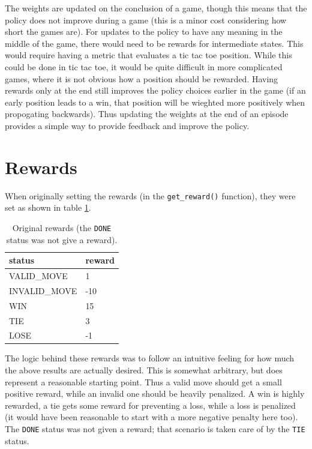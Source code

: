 \documentclass{article}
\renewcommand{\arraystretch}{1.25}
\begin{document}
   The weights are updated on the conclusion of a game, though this means that the policy does not improve
   during a game (this is a minor cost considering how short the games are). For updates to the policy to have
   any meaning in the middle of the game, there would need to be rewards for intermediate states. This would
   require having a metric that evaluates a tic tac toe position. While this could be done in tic tac toe,
   it would be quite difficult in more complicated games, where it is not obvious how a position should be
   rewarded. Having rewards only at the end still improves the policy choices earlier in the game (if an early
   position leads to a win, that position will be wieghted more positively when propogating backwards).
   Thus updating the weights at the end of an episode provides a simple way to provide feedback and improve the
   policy.

   \section{Rewards}
   When originally setting the rewards (in the \texttt{get\_reward()} function), they were set as shown in
   table \ref{part4}.
      \begin{table}[h]
         \centering
         \renewcommand{\arraystretch}{1.5}

         \begin{tabular}{ p{7em}|l }
            \hline
            status     &     reward      \\
            \hline \hline
            VALID\_MOVE        &  1             \\
            INVALID\_MOVE      &  -10             \\
            WIN               &  15             \\
            TIE               &  3             \\
            LOSE              &  -1             \\
            \hline
         \end{tabular}

         \caption{ Original rewards (the \texttt{DONE} status was not give a reward). }
         \label{part4}
      \end{table}
   The logic behind these rewards was to follow an intuitive feeling for how much the above results
   are actually desired. This is somewhat arbitrary, but does represent a reasonable starting point.
   Thus a valid move should get a small positive reward, while an invalid one should
   be heavily penalized. A win is highly rewarded, a tie gets some reward for preventing a loss, while a
   loss is penalized (it would have been reasonable to start with a more negative penalty here too).
   The \texttt{DONE} status was not given a reward; that scenario is taken care of by the \texttt{TIE} status.
\end{document}
